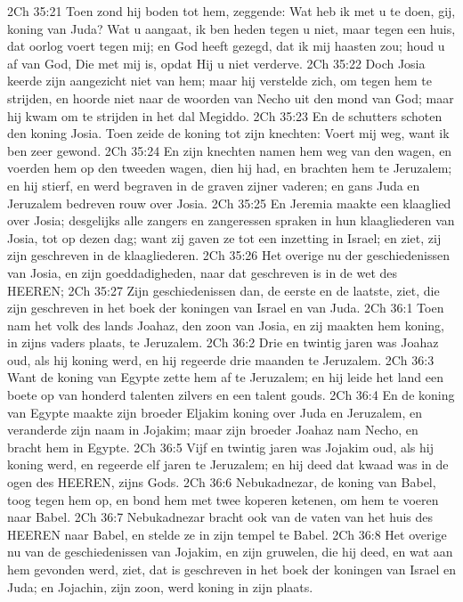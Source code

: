 2Ch 35:21  Toen zond hij boden tot hem, zeggende: Wat heb ik met u te doen, gij, koning van Juda? Wat u aangaat, ik ben heden tegen u niet, maar tegen een huis, dat oorlog voert tegen mij; en God heeft gezegd, dat ik mij haasten zou; houd u af van God, Die met mij is, opdat Hij u niet verderve.
2Ch 35:22  Doch Josia keerde zijn aangezicht niet van hem; maar hij verstelde zich, om tegen hem te strijden, en hoorde niet naar de woorden van Necho uit den mond van God; maar hij kwam om te strijden in het dal Megiddo.
2Ch 35:23  En de schutters schoten den koning Josia. Toen zeide de koning tot zijn knechten: Voert mij weg, want ik ben zeer gewond.
2Ch 35:24  En zijn knechten namen hem weg van den wagen, en voerden hem op den tweeden wagen, dien hij had, en brachten hem te Jeruzalem; en hij stierf, en werd begraven in de graven zijner vaderen; en gans Juda en Jeruzalem bedreven rouw over Josia.
2Ch 35:25  En Jeremia maakte een klaaglied over Josia; desgelijks alle zangers en zangeressen spraken in hun klaagliederen van Josia, tot op dezen dag; want zij gaven ze tot een inzetting in Israel; en ziet, zij zijn geschreven in de klaagliederen.
2Ch 35:26  Het overige nu der geschiedenissen van Josia, en zijn goeddadigheden, naar dat geschreven is in de wet des HEEREN;
2Ch 35:27  Zijn geschiedenissen dan, de eerste en de laatste, ziet, die zijn geschreven in het boek der koningen van Israel en van Juda.
2Ch 36:1  Toen nam het volk des lands Joahaz, den zoon van Josia, en zij maakten hem koning, in zijns vaders plaats, te Jeruzalem.
2Ch 36:2  Drie en twintig jaren was Joahaz oud, als hij koning werd, en hij regeerde drie maanden te Jeruzalem.
2Ch 36:3  Want de koning van Egypte zette hem af te Jeruzalem; en hij leide het land een boete op van honderd talenten zilvers en een talent gouds.
2Ch 36:4  En de koning van Egypte maakte zijn broeder Eljakim koning over Juda en Jeruzalem, en veranderde zijn naam in Jojakim; maar zijn broeder Joahaz nam Necho, en bracht hem in Egypte.
2Ch 36:5  Vijf en twintig jaren was Jojakim oud, als hij koning werd, en regeerde elf jaren te Jeruzalem; en hij deed dat kwaad was in de ogen des HEEREN, zijns Gods.
2Ch 36:6  Nebukadnezar, de koning van Babel, toog tegen hem op, en bond hem met twee koperen ketenen, om hem te voeren naar Babel.
2Ch 36:7  Nebukadnezar bracht ook van de vaten van het huis des HEEREN naar Babel, en stelde ze in zijn tempel te Babel.
2Ch 36:8  Het overige nu van de geschiedenissen van Jojakim, en zijn gruwelen, die hij deed, en wat aan hem gevonden werd, ziet, dat is geschreven in het boek der koningen van Israel en Juda; en Jojachin, zijn zoon, werd koning in zijn plaats.

